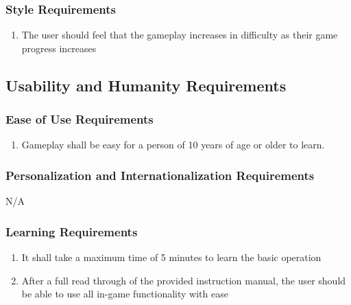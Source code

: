 \documentclass[12pt, titlepage]{article}
\begin{document}
\subsubsection{Style Requirements}
\label{ssub:style_requirements}
\begin{enumerate}[{LF}3. ]
        \item The user should feel that the gameplay increases in difficulty as their game progress increases
\end{enumerate}


\subsection{Usability and Humanity Requirements}
\label{sub:usability_and_humanity_requirements}

\subsubsection{Ease of Use Requirements}
\label{ssub:ease_of_use_requirements}
\begin{enumerate}[start=1,label={ UH\arabic*.}]
        \item Gameplay shall be easy for a person of 10 years of age or older to learn.
\end{enumerate}

\subsubsection{Personalization and Internationalization Requirements}
\label{ssub:personalization_and_internationalization_requirements}
N/A

\subsubsection{Learning Requirements}
\label{ssub:learning_requirements}
\begin{enumerate}[start=2,label={ UH\arabic*.}]
        \item It shall take a maximum time of 5 minutes to learn the basic operation
        \item After a full read through of the provided instruction manual, the user should be able to use all in-game functionality with ease
\end{enumerate}
\end{document}
